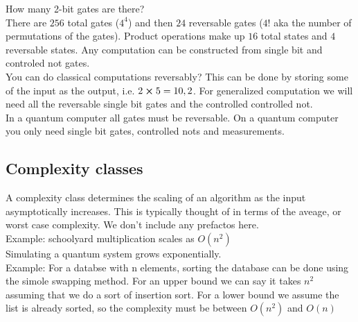 How many 2-bit gates are there? \\
There are $256$ total gates ($4^4$) and then $24$ reversable gates  ($4!$ aka the number of permutations of the gates). Product operations make up $16$ total states and $4$ reversable states. Any computation can be constructed from single bit and controled not gates. \\
You can do classical computations reversably? This can be done by storing some of the input as the output, i.e. $2 \cross 5 = 10,2$. For generalized computation we will need all the reversable single bit gates and the controlled controlled not. \\
In a quantum computer all gates must be reversable. On a quantum computer you only need single bit gates, controlled nots and measurements.
\subsection{Complexity classes}
A complexity class determines the scaling of an algorithm as the input asymptotically increases. This is typically thought of in terms of the aveage, or worst case complexity. We don't include any prefactos here. \\
Example: schoolyard multiplication scales as $O(n^2)$ \\
Simulating a quantum system grows exponentially. \\
Example: For a databse with n elements, sorting the database can be done using the simole swapping method. For an upper bound we can say it takes $n^2$ assuming that we do a sort of insertion sort. For a lower bound we assume the list is already sorted, so the complexity must be between $O(n^2)$ and $O(n)$
